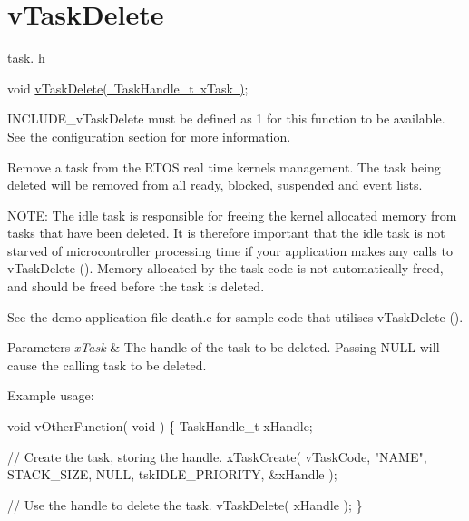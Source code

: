 \hypertarget{group__v_task_delete}{}\section{v\+Task\+Delete}
\label{group__v_task_delete}
task. h 
\begin{DoxyPre}void \mbox{\hyperlink{task_8h_a27ff4ebce26565bef136bda84201ff80}{vTaskDelete( TaskHandle\_t xTask )}};\end{DoxyPre}


I\+N\+C\+L\+U\+D\+E\+\_\+v\+Task\+Delete must be defined as 1 for this function to be available. See the configuration section for more information.

Remove a task from the R\+T\+OS real time kernel\textquotesingle{}s management. The task being deleted will be removed from all ready, blocked, suspended and event lists.

N\+O\+TE\+: The idle task is responsible for freeing the kernel allocated memory from tasks that have been deleted. It is therefore important that the idle task is not starved of microcontroller processing time if your application makes any calls to v\+Task\+Delete (). Memory allocated by the task code is not automatically freed, and should be freed before the task is deleted.

See the demo application file death.\+c for sample code that utilises v\+Task\+Delete ().


\begin{DoxyParams}{Parameters}
{\em x\+Task} & The handle of the task to be deleted. Passing N\+U\+LL will cause the calling task to be deleted.\\
\hline
\end{DoxyParams}
Example usage\+: 
\begin{DoxyPre}
void vOtherFunction( void )
\{
TaskHandle\_t xHandle;\end{DoxyPre}



\begin{DoxyPre}    // Create the task, storing the handle.
    xTaskCreate( vTaskCode, "NAME", STACK\_SIZE, NULL, tskIDLE\_PRIORITY, \&xHandle );\end{DoxyPre}



\begin{DoxyPre}    // Use the handle to delete the task.
    vTaskDelete( xHandle );
\}
  \end{DoxyPre}
 